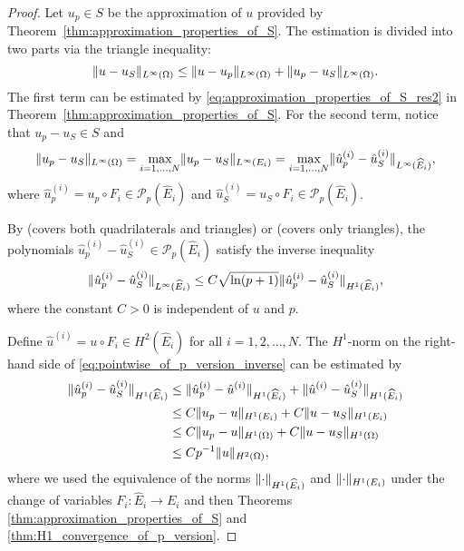 \documentclass[english, 12pt, a4paper, sci, utf8, a-2b, online]{aaltothesis}
\theoremstyle{definition}
\theoremstyle{plain}
\DeclarePairedDelimiter\norm{\lVert}{\rVert}
\numberwithin{equation}{section}
\begin{document}
\begin{proof}
    Let $u_p \in S$ be the approximation of $u$ provided by
    Theorem~\ref{thm:approximation_properties_of_S}.
    The estimation is divided into two parts via the triangle inequality:
    \begin{equation}
        \label{eq:pointwise_convergence_of_p_fem_init_split}
        \norm{u-u_S}_{L^{\infty}(\Omega)}
        \leq \norm{u-u_p}_{L^{\infty}(\Omega)}
            + \norm{u_p-u_S}_{L^{\infty}(\Omega)}.
    \end{equation}
    The first term can be estimated by \eqref{eq:approximation_properties_of_S_res2}
    in Theorem~\ref{thm:approximation_properties_of_S}.
    For the second term, notice that $u_p - u_S \in S$ and
    \begin{equation}
        \label{eq:pointwise_of_p_version_before_inverse}
        \norm{u_p-u_S}_{L^{\infty}(\Omega)}
        = \max_{i=1,\dotsc,N} \norm{u_p - u_S}_{L^{\infty}(E_i)}
        = \max_{i=1,\dotsc,N}
            \norm{\hat{u}_p^{(i)} - \hat{u}_S^{(i)}}_{L^{\infty}(\widehat{E}_i)},
    \end{equation}
    where $\hat{u}_p^{(i)} = u_p \circ F_i \in \mathcal{P}_p(\widehat{E}_i)$
    and $\hat{u}_S^{(i)} = u_S \circ F_i \in \mathcal{P}_p(\widehat{E}_i)$.

    By \cite[Theorem~4.76 on p.~208]{schwab1998} (covers both quadrilaterals and triangles)
    or \cite[Proposition~3.1]{boillat1997} (covers only triangles),
    the polynomials $\hat{u}_p^{(i)} - \hat{u}_S^{(i)} \in \mathcal{P}_p(\widehat{E}_i)$
    satisfy the inverse inequality
    \begin{equation}
        \label{eq:pointwise_of_p_version_inverse}
        \norm{\hat{u}_p^{(i)} - \hat{u}_S^{(i)}}_{L^{\infty}(\widehat{E}_i)}
        \leq C \sqrt{\ln(p+1)}
            \norm{\hat{u}_p^{(i)} - \hat{u}_S^{(i)}}_{H^1(\widehat{E}_i)},
    \end{equation}
    where the constant $C > 0$ is independent of $u$ and $p$.
    
    Define $\hat{u}^{(i)} = u \circ F_i \in H^2(\widehat{E}_i)$ for all $i=1,2,\dotsc,N$.
    The $H^1$-norm on the right-hand side of \eqref{eq:pointwise_of_p_version_inverse}
    can be estimated by
    \begin{align}
        \norm{\hat{u}_p^{(i)} - \hat{u}_S^{(i)}}_{H^1(\widehat{E}_i)}
        &\leq \norm{\hat{u}_p^{(i)} - \hat{u}^{(i)}}_{H^1(\widehat{E}_i)}
            + \norm{\hat{u}^{(i)} - \hat{u}_S^{(i)}}_{H^1(\widehat{E}_i)} \nonumber \\
        &\leq C \norm{u_p - u}_{H^1(E_i)} + C \norm{u - u_S}_{H^1(E_i)} \nonumber \\
        &\leq C \norm{u_p - u}_{H^1(\Omega)} + C \norm{u - u_S}_{H^1(\Omega)} \nonumber \\
        \label{eq:pointwise_of_p_version_inverse_refined}
        &\leq C p^{-1} \norm{u}_{H^2(\Omega)},
    \end{align}
    where we used the equivalence of the norms $\norm{\cdot}_{H^1(\widehat{E}_i)}$ and
    $\norm{\cdot}_{H^1(E_i)}$ under the change of variables $F_i: \widehat{E}_i \to E_i$ and then
    Theorems \ref{thm:approximation_properties_of_S} and \ref{thm:H1_convergence_of_p_version}.


\end{proof}
\end{document}
